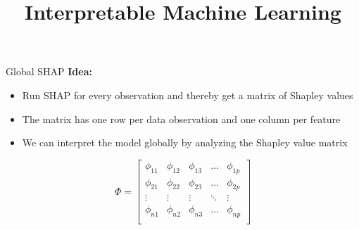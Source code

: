 \documentclass[10pt,compress,t,notes=noshow, xcolor=table]{beamer}
\title{Interpretable Machine Learning}
\date{}
\begin{document}
\newcommand{\titlefigure}{figure_man/global_shap_depend_season.pdf}
\newcommand{\learninggoals}{
\item Understand how SHAP values can be aggregated for global model interpretation
\item Learn global SHAP visualizations: feature importance, summary, and dependence plots
\item Recognize advantages and limitations of global SHAP explanations
}


\begin{frame}{Global SHAP }
\textbf{Idea: }
\begin{itemize}
    \item Run SHAP for every observation and thereby get a matrix of Shapley values
    \item The matrix has one row per data observation and one column per feature
    \item We can interpret the model globally by analyzing the Shapley value matrix
\end{itemize}
\vspace{2cm}
$$
\Phi =
\begin{bmatrix}
    \phi_{11} & \phi_{12} & \phi_{13} & \dots  & \phi_{1p} \\
    \phi_{21} & \phi_{22} & \phi_{23} & \dots  & \phi_{2p} \\
    \vdots & \vdots & \vdots & \ddots & \vdots \\
    \phi_{n1} & \phi_{n2} & \phi_{n3} & \dots  & \phi_{np} \\
\end{bmatrix}
$$

 \end{frame}
\end{document}
